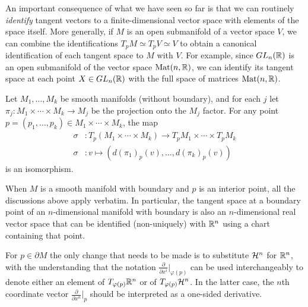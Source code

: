 An important consequence of what we have seen so far is that we can routinely \emph{identify} tangent vectors to a finite-dimensional vector space with elements of the space itself.
More generally, if $M$ is an open submanifold of a vector space $V$, we can combine the identifications $T_p M \simeq T_p V \simeq V$ to obtain a canonical identification of each tangent space to $M$ with $V$.
For example, since $GL_n(\mathbb{R})$ is an open submanifold of the vector space $\mathrm{Mat}(n, \mathbb{R})$, we can identify its tangent space at each point $X\in GL_n(\mathbb{R})$ with the full space of matrices $\mathrm{Mat}(n, \mathbb{R})$.

\begin{exercise}
  Let $M_1, \ldots, M_k$ be smooth manifolds (without boundary), and for each $j$ let $\pi_j:M_1\times\cdots\times M_k \to M_j$ be the projection onto the $M_j$ factor.
  For any point $p=(p_1,\ldots,p_k)\in M_1\times\cdots\times M_k$, the map
  \begin{align}
    \sigma &: T_p(M_1\times\cdots\times M_k) \to T_p M_1\times\cdots\times T_p M_k\\
    \sigma &: v \mapsto \left(d(\pi_1)_p(v), \ldots, d(\pi_k)_p(v)\right)
  \end{align}
  is an isomorphism.
\end{exercise}

\begin{remark}
  When $M$ is a smooth manifold with boundary and $p$ is an interior point, all the discussions above apply verbatim. In particular, the tangent space at a boundary point of an $n$-dimensional manifold with boundary is also an $n$-dimensional real vector space that can be identified (non-uniquely) with $\mathbb{R}^n$ using a chart containing that point.

  For $p\in\partial M$ the only change that needs to be made is to substitute $\mathcal{H}^n$ for $\mathbb{R}^n$, with the understanding that the notation $\frac{\partial}{\partial x^i}\big|_{\varphi(p)}$ can be used interchangeably to denote either an element of $T_{\varphi(p)}\mathbb{R}^n$ or of $T_{\varphi(p)}\mathcal{H}^n$. In the latter case, the $n$th coordinate vector $\frac{\partial}{\partial x^n}\big|_{p}$ should be interpreted as a one-sided derivative.
\end{remark}

